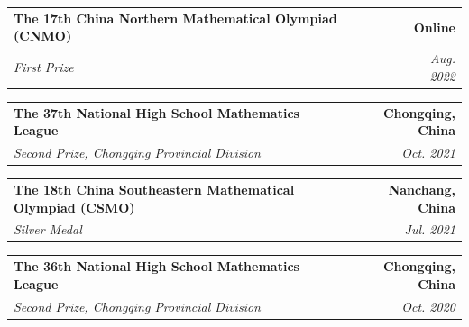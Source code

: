 \documentclass[a4paper,11pt]{article}
\makeatletter
\newcommand{\resumeSubheading}[4]{
  \vspace{2pt}
  \begin{tabular*}{\textwidth}{l@{\extracolsep{\fill}}r}
    \textbf{#1} & \textbf{#2} \\
    \textit{#3} & \textit{#4} \\
  \end{tabular*}
  \vspace{-4pt}
}
\makeatother
\begin{document}
\resumeSubheading
{The 17th China Northern Mathematical Olympiad (CNMO)}
{Online}
{First Prize}
{Aug. 2022}

\resumeSubheading
{The 37th National High School Mathematics League}
{Chongqing, China}
{Second Prize, Chongqing Provincial Division}
{Oct. 2021}


\resumeSubheading
{The 18th China Southeastern Mathematical Olympiad (CSMO)}
{Nanchang, China}
{Silver Medal}
{Jul. 2021}

\resumeSubheading
{The 36th National High School Mathematics League}
{Chongqing, China}
{Second Prize, Chongqing Provincial Division}
{Oct. 2020}
\end{document}
